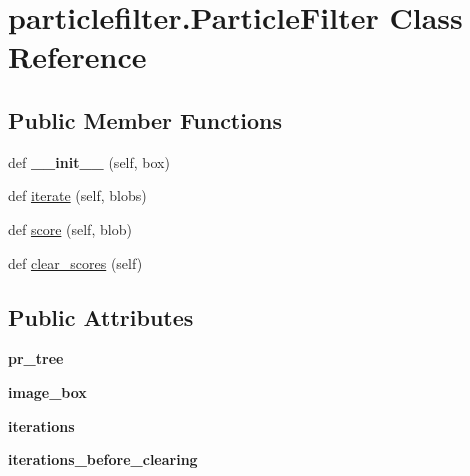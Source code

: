 \hypertarget{classparticlefilter_1_1ParticleFilter}{}\section{particlefilter.\+Particle\+Filter Class Reference}
\label{classparticlefilter_1_1ParticleFilter}
\subsection*{Public Member Functions}
\begin{DoxyCompactItemize}
\item 
\hypertarget{classparticlefilter_1_1ParticleFilter_a6948f5fd9e23311a5d852d4cee9fcd74}{}def {\bfseries \+\_\+\+\_\+init\+\_\+\+\_\+} (self, box)\label{classparticlefilter_1_1ParticleFilter_a6948f5fd9e23311a5d852d4cee9fcd74}

\item 
def \hyperlink{classparticlefilter_1_1ParticleFilter_a712cbf35d447e829bee6eb3511d6ed84}{iterate} (self, blobs)
\item 
def \hyperlink{classparticlefilter_1_1ParticleFilter_a14d4400ba16d6413f279baa8d0aaff2d}{score} (self, blob)
\item 
def \hyperlink{classparticlefilter_1_1ParticleFilter_a23de668d643dfd03ef021b18129be7ec}{clear\+\_\+scores} (self)
\end{DoxyCompactItemize}
\subsection*{Public Attributes}
\begin{DoxyCompactItemize}
\item 
\hypertarget{classparticlefilter_1_1ParticleFilter_ad105183603f7e2a9b31ad9b51a904876}{}{\bfseries pr\+\_\+tree}\label{classparticlefilter_1_1ParticleFilter_ad105183603f7e2a9b31ad9b51a904876}

\item 
\hypertarget{classparticlefilter_1_1ParticleFilter_a057adc68ef8ba14478db6e8a453eca32}{}{\bfseries image\+\_\+box}\label{classparticlefilter_1_1ParticleFilter_a057adc68ef8ba14478db6e8a453eca32}

\item 
\hypertarget{classparticlefilter_1_1ParticleFilter_a6bb442d25bc95fd1174e0f1f65a5b059}{}{\bfseries iterations}\label{classparticlefilter_1_1ParticleFilter_a6bb442d25bc95fd1174e0f1f65a5b059}

\item 
\hypertarget{classparticlefilter_1_1ParticleFilter_a3aee419fa01abd6a08a0b512a79d5123}{}{\bfseries iterations\+\_\+before\+\_\+clearing}\label{classparticlefilter_1_1ParticleFilter_a3aee419fa01abd6a08a0b512a79d5123}

\end{DoxyCompactItemize}



